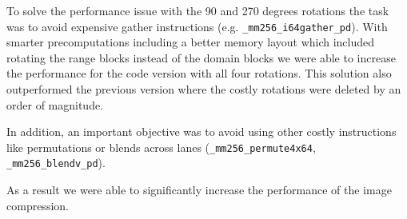 To solve the performance issue with the 90 and 270 degrees rotations the task
was to avoid expensive gather instructions (e.g. \verb|_mm256_i64gather_pd|).
With smarter precomputations including a better memory layout which included
rotating the range blocks instead of the domain blocks we were able to increase
the performance for the code version with all four rotations. This solution also
outperformed the previous version where the costly rotations were deleted by an
order of magnitude.

In addition, an important objective was to avoid using other costly instructions
like permutations or blends across lanes (\verb|_mm256_permute4x64|,
\verb|_mm256_blendv_pd|).

As a result we were able to significantly increase the performance of the image
compression.
